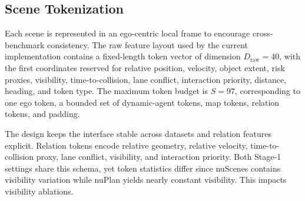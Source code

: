 \documentclass[10pt,journal,compsoc]{IEEEtran}
\begin{document}
\subsection{Scene Tokenization}
Each scene is represented in an ego-centric local frame to encourage cross-benchmark consistency. The raw feature layout used by the current implementation contains a fixed-length token vector of dimension $D_{\mathrm{raw}}=40$, with the first coordinates reserved for relative position, velocity, object extent, risk proxies, visibility, time-to-collision, lane conflict, interaction priority, distance, heading, and token type. The maximum token budget is $S=97$, corresponding to one ego token, a bounded set of dynamic-agent tokens, map tokens, relation tokens, and padding.


The design keeps the interface stable across datasets and relation features explicit. Relation tokens encode relative geometry, relative velocity, time-to-collision proxy, lane conflict, visibility, and interaction priority. Both Stage-1 settings share this schema, yet token statistics differ since nuScenes contains visibility variation while nuPlan yields nearly constant visibility. This impacts visibility ablations.



\end{document}
